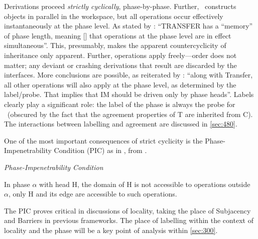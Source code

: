 Derivations proceed \textit{strictly cyclically}, phase-by-phase. Further, \CHL\ constructs objects in parallel in the workspace, but all operations occur effectively instantaneously at the phase level. As stated by \textcite[116]{ChomskyN_2004}: ``TRANSFER has a ``memory'' of phase length, meaning [] that operations at the phase level are in effect simultaneous''. This, presumably, makes the apparent countercyclicity of inheritance only apparent. Further, operations apply freely---order does not matter; any deviant or crashing derivations that result are discarded by the interfaces. More conclusions are possible, as reiterated by \textcite[143]{ChomskyN_2008}: ``along with Transfer, all other operations will also apply at the phase level, as determined by the label/probe. That implies that IM should be driven only by phase heads''. Labels clearly play a significant role: the label of the phase is always the probe for \AGREE\ (obscured by the fact that the agreement properties of T are inherited from C). The interactions between labelling and agreement are discussed in \autoref{sec:480}.

One of the most important consequences of strict cyclicity is the Phase-Impenetrability Condition (PIC) as in , from \textcite[108]{ChomskyN_2000}.

\begin{example}\label{ex:PIC}
\setlength{\parskip}{0pt}\setlength{\parsep}{0pt}
\textit{Phase-Impenetrability Condition}

In phase $\alpha$ with head H, the domain of H is not accessible to operations outside $\alpha$, only H and its edge are accessible to such operations.
\end{example}
\noindent
The PIC proves critical in discussions of locality, taking the place of Subjacency \parencite{ChomskyN_1973} and Barriers \parencite{ChomskyN_1986} in previous frameworks. The place of labelling within the context of locality and the phase will be a key point of analysis within \autoref{sec:300}.
